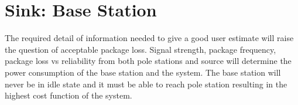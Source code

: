 \section{Sink: Base Station}\label{sc:sinkBaseStation}
The required detail of information needed to give a good user estimate will raise the question of acceptable package loss. Signal strength, package frequency, package loss vs reliability from both pole stations and source will determine the power consumption of the base station and the system. The base station will never be in idle state and it must be able to reach pole station resulting in the highest cost function of the system.
